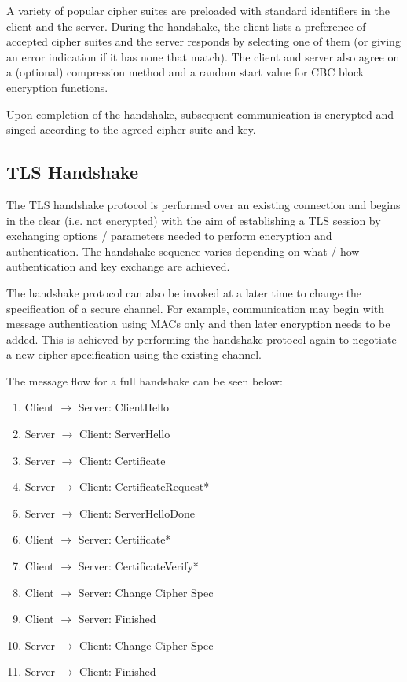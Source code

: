 A variety of popular cipher suites are preloaded with standard identifiers in the client and the server. During the handshake, the client lists a preference of accepted cipher suites and the server responds by selecting one of them (or giving an error indication if it has none that match). The client and server also agree on a (optional) compression method and a random start value for CBC block encryption functions.

Upon completion of the handshake, subsequent communication is encrypted and singed according to the agreed cipher suite and key. 

\subsection{TLS Handshake}
The TLS handshake protocol is performed over an existing connection and begins in the clear (i.e. not encrypted) with the aim of establishing a TLS session by exchanging options / parameters needed to perform encryption and authentication. The handshake sequence varies depending on what / how authentication and key exchange are achieved.

The handshake protocol can also be invoked at a later time to change the specification of a secure channel. For example, communication may begin with message authentication using MACs only and then later encryption needs to be added. This is achieved by performing the handshake protocol again to negotiate a new cipher specification using the existing channel. 

The message flow for a full handshake can be seen below:
\begin{enumerate}
    \item Client $\rightarrow$ Server: ClientHello
    \item Server $\rightarrow$ Client: ServerHello
    \item Server $\rightarrow$ Client: Certificate
    \item Server $\rightarrow$ Client: CertificateRequest*
    \item Server $\rightarrow$ Client: ServerHelloDone
    \item Client $\rightarrow$ Server: Certificate*
    \item Client $\rightarrow$ Server: CertificateVerify*
    \item Client $\rightarrow$ Server: Change Cipher Spec
    \item Client $\rightarrow$ Server: Finished
    \item Server $\rightarrow$ Client: Change Cipher Spec
    \item Server $\rightarrow$ Client: Finished
\end{enumerate}

